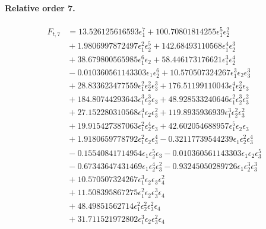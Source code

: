 \documentclass[10pt]{article}
\begin{document}
\paragraph{Relative order 7.}
\begin{align*}
F_{t,7} &= 13.526125616593 \epsilon_{1}^{7} + 100.70801814255 \epsilon_{1}^{5} \epsilon_{2}^{2} \\
&{}  + 1.9806997872497 \epsilon_{1}^{2} \epsilon_{2}^{5} + 142.68493110568 \epsilon_{1}^{4} \epsilon_{2}^{3} \\
&{}  + 38.679800565985 \epsilon_{1}^{6} \epsilon_{2} + 58.446173176621 \epsilon_{1}^{3} \epsilon_{2}^{4} \\
&{}  - 0.010360561143303 \epsilon_{1} \epsilon_{2}^{6} + 10.570507324267 \epsilon_{1}^{3} \epsilon_{2} \epsilon_{3}^{3} \\
&{}  + 28.833623477559 \epsilon_{1}^{2} \epsilon_{2}^{2} \epsilon_{3}^{3} + 176.51199110043 \epsilon_{1}^{4} \epsilon_{2}^{2} \epsilon_{3} \\
&{}  + 184.80744293643 \epsilon_{1}^{3} \epsilon_{2}^{3} \epsilon_{3} + 48.928533240646 \epsilon_{1}^{2} \epsilon_{2}^{3} \epsilon_{3}^{2} \\
&{}  + 27.152280310568 \epsilon_{1}^{4} \epsilon_{2} \epsilon_{3}^{2} + 119.8935936939 \epsilon_{1}^{3} \epsilon_{2}^{2} \epsilon_{3}^{2} \\
&{}  + 19.915427387063 \epsilon_{1}^{2} \epsilon_{2}^{4} \epsilon_{3} + 42.602054688957 \epsilon_{1}^{5} \epsilon_{2} \epsilon_{3} \\
&{}  + 1.9180659778792 \epsilon_{1}^{2} \epsilon_{2} \epsilon_{3}^{4} - 0.32117739544239 \epsilon_{1} \epsilon_{2}^{2} \epsilon_{3}^{4} \\
&{}  - 0.15540841714954 \epsilon_{1} \epsilon_{2}^{5} \epsilon_{3} - 0.010360561143303 \epsilon_{1} \epsilon_{2} \epsilon_{3}^{5} \\
&{}  - 0.67343647431469 \epsilon_{1} \epsilon_{2}^{4} \epsilon_{3}^{2} - 0.93245050289726 \epsilon_{1} \epsilon_{2}^{3} \epsilon_{3}^{3} \\
&{}  + 10.570507324267 \epsilon_{1}^{3} \epsilon_{2} \epsilon_{3} \epsilon_{4}^{2} \\
&{}  + 11.508395867275 \epsilon_{1}^{2} \epsilon_{2} \epsilon_{3}^{3} \epsilon_{4} \\
&{}  + 48.49851562714 \epsilon_{1}^{2} \epsilon_{2}^{2} \epsilon_{3}^{2} \epsilon_{4} \\
&{}  + 31.711521972802 \epsilon_{1}^{3} \epsilon_{2} \epsilon_{3}^{2} \epsilon_{4} \\

\end{align*}
\end{document}
